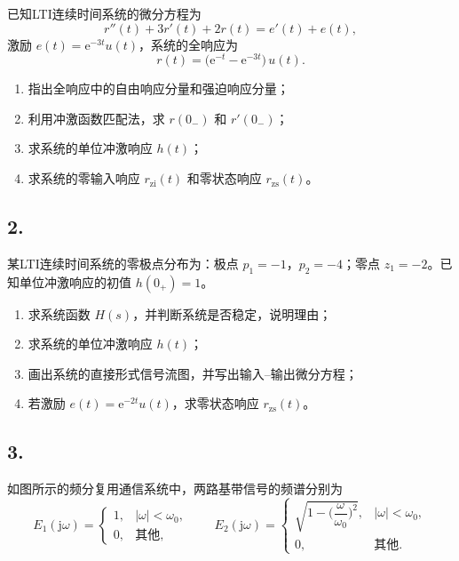 \documentclass[10pt,a4paper]{ctexart}
\begin{document}
已知LTI连续时间系统的微分方程为
\[
r''(t)+3r'(t)+2r(t)=e'(t)+e(t),
\]
激励 $e(t)=\mathrm{e}^{-3t}u(t)$，系统的全响应为
\[
r(t)=\bigl(\mathrm{e}^{-t}-\mathrm{e}^{-3t}\bigr)\,u(t).
\]

\begin{enumerate}[label=(\arabic*),leftmargin=*]
  \item 指出全响应中的自由响应分量和强迫响应分量；
  \item 利用冲激函数匹配法，求 $r(0_-)$ 和 $r'(0_-)$；
  \item 求系统的单位冲激响应 $h(t)$；
  \item 求系统的零输入响应 $r_{\mathrm{zi}}(t)$ 和零状态响应 $r_{\mathrm{zs}}(t)$。
\end{enumerate}

\subsection*{2.}

某LTI连续时间系统的零极点分布为：极点 $p_1=-1$，$p_2=-4$；零点 $z_1=-2$。已知单位冲激响应的初值 $h(0_+)=1$。

\begin{enumerate}[label=(\arabic*),leftmargin=*]
  \item 求系统函数 $H(s)$，并判断系统是否稳定，说明理由；
  \item 求系统的单位冲激响应 $h(t)$；
  \item 画出系统的直接形式信号流图，并写出输入--输出微分方程；
  \item 若激励 $e(t)=\mathrm{e}^{-2t}u(t)$，求零状态响应 $r_{\mathrm{zs}}(t)$。
\end{enumerate}

\subsection*{3.}

如图所示的频分复用通信系统中，两路基带信号的频谱分别为
\[
E_1(\mathrm{j}\omega)=
\begin{cases}
1, & |\omega|<\omega_0,\\
0, & \text{其他},
\end{cases}
\qquad
E_2(\mathrm{j}\omega)=
\begin{cases}
\sqrt{1-\bigl(\dfrac{\omega}{\omega_0}\bigr)^2}, & |\omega|<\omega_0,\\[8pt]
0, & \text{其他}.
\end{cases}
\]
\end{document}
